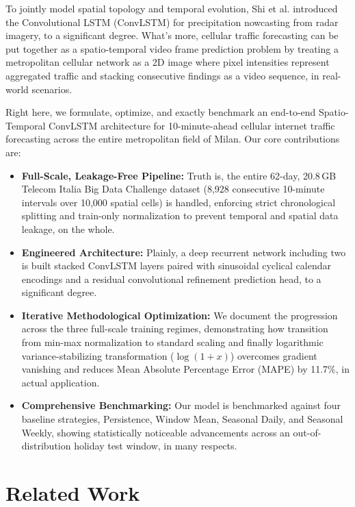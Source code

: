 \documentclass[conference]{IEEEtran}
\begin{document}
To jointly model spatial topology and temporal evolution, Shi et al. \cite{b4} introduced the Convolutional LSTM (ConvLSTM) for precipitation nowcasting from radar imagery, to a significant degree. What's more, cellular traffic forecasting can be put together as a spatio-temporal video frame prediction problem \cite{b5} by treating a metropolitan cellular network as a 2D image where pixel intensities represent aggregated traffic and stacking consecutive findings as a video sequence, in real-world scenarios.

Right here, we formulate, optimize, and exactly benchmark an end-to-end Spatio-Temporal ConvLSTM architecture for 10-minute-ahead cellular internet traffic forecasting across the entire metropolitan field of Milan. Our core contributions are:
\begin{itemize}
    \item \textbf{Full-Scale, Leakage-Free Pipeline:} Truth is, the entire 62-day, 20.8\,GB Telecom Italia Big Data Challenge dataset (8,928 consecutive 10-minute intervals over 10,000 spatial cells) is handled, enforcing strict chronological splitting and train-only normalization to prevent temporal and spatial data leakage, on the whole.
    \item \textbf{Engineered Architecture:} Plainly, a deep recurrent network including two is built stacked ConvLSTM layers paired with sinusoidal cyclical calendar encodings and a residual convolutional refinement prediction head, to a significant degree.
    \item \textbf{Iterative Methodological Optimization:} We document the progression across the three full-scale training regimes, demonstrating how transition from min-max normalization to standard scaling and finally logarithmic variance-stabilizing transformation ($\log(1+x)$) overcomes gradient vanishing and reduces Mean Absolute Percentage Error (MAPE) by 11.7\%, in actual application.
    \item \textbf{Comprehensive Benchmarking:} Our model is benchmarked against four baseline strategies, Persistence, Window Mean, Seasonal Daily, and Seasonal Weekly, showing statistically noticeable advancements across an out-of-distribution holiday test window, in many respects.
\end{itemize}

\section{Related Work}
\end{document}
